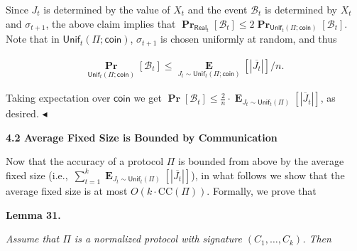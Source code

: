


Since $J_{t}$ is determined by the value of $X_{t}$ and the event $\mathcal{B}_{t}$ is determined by $X_{t}$ and $\sigma_{t+1}$, the above claim implies that
$\operatorname*{\mathbf{Pr}}_{\mathsf{Real}_{t}}\left[\mathcal{B}_{t}\right]\leq 2\operatorname*{\mathbf{Pr}}_{\mathsf{Unif}_{t}(\Pi;\mathsf{coin})}\left[\mathcal{B}_{t}\right].$
Note that in $\mathsf{Unif}_{t}(\Pi;\mathsf{coin})$, $\sigma_{t+1}$ is chosen uniformly at random, and thus\par


\[\begin{gathered}
\operatorname*{\mathbf{Pr}}_{\mathsf{Unif}_{t}(\Pi;\mathsf{coin})}\left[\mathcal{B}_{t}\right]\leq\operatorname*{\mathbf{E}}_{J_{t}\sim\mathsf{Unif}_{t}(\Pi;\mathsf{coin})}\left[|\overline{J_{t}}|\right]/n.
\end{gathered}\]


Taking expectation over $\mathsf{coin}$ we get $\operatorname*{\mathbf{Pr}}\left[\mathcal{B}_{t}\right]\leq\frac{2}{n}\cdot\operatorname*{\mathbf{E}}_{J_{t}\sim\mathsf{Unif}_{t}(\Pi)}\left[|\overline{J}_{t}|\right]$, as desired.
$\blacktriangleleft$\par






\par\medskip\noindent\textbf{
4.2 Average Fixed Size is Bounded by Communication}\par




Now that the accuracy of a protocol $\Pi$ is bounded from above by the average fixed size (i.e., $\sum_{t=1}^{k}\operatorname*{\mathbf{E}}_{J_{t}\sim\mathsf{Unif}_{t}(\Pi)}\left[|\overline{J_{t}}|\right]$), in what follows we show that the average fixed size is at most $O(k\cdot\mathrm{CC}(\Pi))$.
Formally, we prove that\par





\par\medskip\noindent\textbf{
\textbf{Lemma 31}\textbf{.}
}\par



\emph{Assume that $\Pi$ is a normalized protocol with signature $(C_{1},\dots,C_{k})$.
Then}\par


